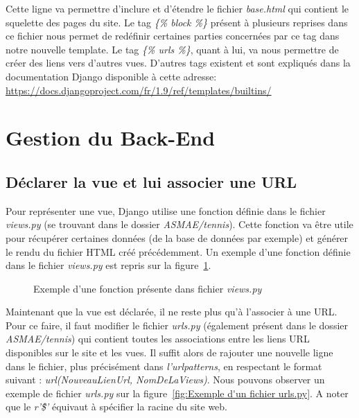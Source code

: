 Cette ligne va permettre d'inclure et d'étendre le fichier \textit{base.html} qui contient le squelette des pages du site. Le tag \textit{\{\% block \%\}} présent à plusieurs reprises dans ce fichier nous permet de redéfinir certaines parties concernées par ce tag dans notre nouvelle template. Le tag \textit{\{\% urls \%\}}, quant à lui, va nous permettre de créer des liens vers d'autres vues. D'autres tags existent et sont expliqués dans la documentation Django disponible à cette adresse: \url{https://docs.djangoproject.com/fr/1.9/ref/templates/builtins/}

\section{Gestion du Back-End}

\subsection{Déclarer la vue et lui associer une URL}

Pour représenter une vue, Django utilise une fonction définie dans le fichier \textit{views.py} (se trouvant dans le dossier \textit{ASMAE/tennis}). Cette fonction va être utile pour récupérer certaines données (de la base de données par exemple) et générer le rendu du fichier HTML créé précédemment. Un exemple d'une fonction définie dans le fichier \textit{views.py} est repris sur la figure~\ref{fig:Exemple d'une fonction présente dans le fichier views.py}.


\begin{figure}[!ht]
\centering

\caption{Exemple d'une fonction présente dans fichier \textit{views.py}}
\label{fig:Exemple d'une fonction présente dans le fichier views.py}
\end{figure}
\FloatBarrier

Maintenant que la vue est déclarée, il ne reste plus qu'à l'associer à une URL. Pour ce faire, il faut modifier le fichier \textit{urls.py} (également présent dans le dossier \textit{ASMAE/tennis}) qui contient toutes les associations entre les liens URL disponibles sur le site et les vues. Il suffit alors de rajouter une nouvelle ligne dans le fichier, plus précisément dans \textit{l'urlpatterns}, en respectant le format suivant : \textit{url(NouveauLienUrl, NomDeLaViews)}. Nous pouvons observer un exemple de fichier \textit{urls.py} sur la figure~\ref{fig:Exemple d'un fichier urls.py}. A noter que le \textit{r'\^\$'} équivaut à spécifier la racine du site web.

